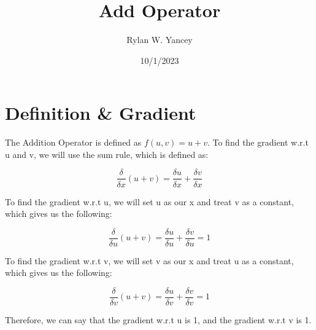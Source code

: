 \documentclass{article}
\title{Add Operator}
\author{Rylan W. Yancey}
\date{10/1/2023}
\begin{document}
    \maketitle
    \section*{Definition \& Gradient}
        The Addition Operator is defined as $f(u,v) = u + v$. To find the gradient w.r.t u and v, 
        we will use the sum rule, which is defined as: 

        $$\frac{\delta}{\delta{x}}(u + v) = \frac{\delta{u}}{\delta{x}} + \frac{\delta{v}}{\delta{x}}$$

        To find the gradient w.r.t u, we will set u as our x and treat v as a constant, 
        which gives us the following:

        $$\frac{\delta}{\delta{u}}(u + v) = \frac{\delta{u}}{\delta{u}} + \frac{\delta{v}}{\delta{u}} = 1$$

        To find the gradient w.r.t v, we will set v as our x and treat u as a constant, 
        which gives us the following:

        $$\frac{\delta}{\delta{v}}(u + v) = \frac{\delta{u}}{\delta{v}} + \frac{\delta{v}}{\delta{v}} = 1$$

        Therefore, we can say that the gradient w.r.t u is 1, and the gradient w.r.t v is 1. 
\end{document}

